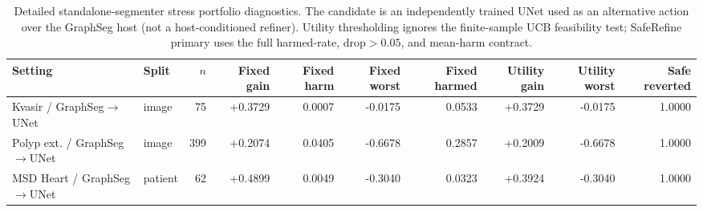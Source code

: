 \begin{table}[t]
\centering
\caption{Detailed standalone-segmenter stress portfolio diagnostics. The candidate is an independently trained UNet used as an alternative action over the GraphSeg host (not a host-conditioned refiner). Utility thresholding ignores the finite-sample UCB feasibility test; SafeRefine primary uses the full harmed-rate, drop$>0.05$, and mean-harm contract.}
\label{tab:learned_refiner_stress_detail}
\begin{tabular}{llrrrrrrrr}
\toprule
Setting & Split & $n$ & Fixed gain & Fixed harm & Fixed worst & Fixed harmed & Utility gain & Utility worst & Safe reverted \\
\midrule
Kvasir / GraphSeg$\rightarrow$UNet & image & 75 & +0.3729 & 0.0007 & -0.0175 & 0.0533 & +0.3729 & -0.0175 & 1.0000 \\
Polyp ext. / GraphSeg$\rightarrow$UNet & image & 399 & +0.2074 & 0.0405 & -0.6678 & 0.2857 & +0.2009 & -0.6678 & 1.0000 \\
MSD Heart / GraphSeg$\rightarrow$UNet & patient & 62 & +0.4899 & 0.0049 & -0.3040 & 0.0323 & +0.3924 & -0.3040 & 1.0000 \\
\bottomrule
\end{tabular}
\end{table}
